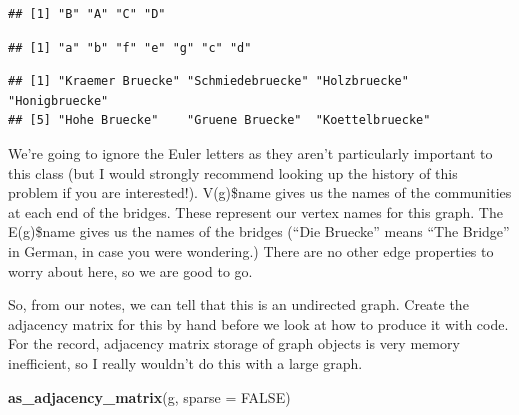 \documentclass[
]{article}
\newenvironment{Shaded}{\begin{snugshade}}{\end{snugshade}}
\newcommand{\AttributeTok}[1]{\textcolor[rgb]{0.13,0.29,0.53}{#1}}
\newcommand{\ConstantTok}[1]{\textcolor[rgb]{0.56,0.35,0.01}{#1}}
\newcommand{\FunctionTok}[1]{\textcolor[rgb]{0.13,0.29,0.53}{\textbf{#1}}}
\newcommand{\NormalTok}[1]{#1}
\newcommand{\SpecialCharTok}[1]{\textcolor[rgb]{0.81,0.36,0.00}{\textbf{#1}}}
\begin{document}
\begin{Shaded}
\end{Shaded}

\begin{verbatim}
## [1] "B" "A" "C" "D"
\end{verbatim}

\begin{Shaded}
\end{Shaded}

\begin{verbatim}
## [1] "a" "b" "f" "e" "g" "c" "d"
\end{verbatim}

\begin{Shaded}
\end{Shaded}

\begin{verbatim}
## [1] "Kraemer Bruecke" "Schmiedebruecke" "Holzbruecke"     "Honigbruecke"   
## [5] "Hohe Bruecke"    "Gruene Bruecke"  "Koettelbruecke"
\end{verbatim}

We're going to ignore the Euler letters as they aren't particularly
important to this class (but I would strongly recommend looking up the
history of this problem if you are interested!). V(g)\$name gives us the
names of the communities at each end of the bridges. These represent our
vertex names for this graph. The E(g)\$name gives us the names of the
bridges (``Die Bruecke'' means ``The Bridge'' in German, in case you
were wondering.) There are no other edge properties to worry about here,
so we are good to go.

So, from our notes, we can tell that this is an undirected graph. Create
the adjacency matrix for this by hand before we look at how to produce
it with code. For the record, adjacency matrix storage of graph objects
is very memory inefficient, so I really wouldn't do this with a large
graph.

\begin{Shaded}
\begin{Highlighting}[]
\FunctionTok{as\_adjacency\_matrix}\NormalTok{(g, }\AttributeTok{sparse =} \ConstantTok{FALSE}\NormalTok{)}
\end{Highlighting}
\end{Shaded}
\end{document}
